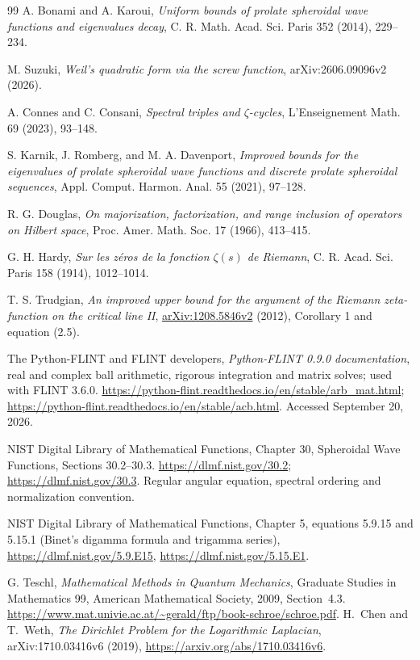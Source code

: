 \documentclass[11pt]{article}
\theoremstyle{remark}
\begin{document}
\begin{thebibliography}{99}
A. Bonami and A. Karoui,
\emph{Uniform bounds of prolate spheroidal wave functions and eigenvalues decay},
C. R. Math. Acad. Sci. Paris 352 (2014), 229--234.

M. Suzuki,
\emph{Weil's quadratic form via the screw function},
arXiv:2606.09096v2 (2026).

A. Connes and C. Consani,
\emph{Spectral triples and $\zeta$-cycles},
L'Enseignement Math. 69 (2023), 93--148.

S. Karnik, J. Romberg, and M. A. Davenport,
\emph{Improved bounds for the eigenvalues of prolate spheroidal wave functions and discrete prolate spheroidal sequences},
Appl. Comput. Harmon. Anal. 55 (2021), 97--128.

R. G. Douglas,
\emph{On majorization, factorization, and range inclusion of operators on Hilbert space},
Proc. Amer. Math. Soc. 17 (1966), 413--415.

G. H. Hardy, \emph{Sur les z\'eros de la fonction $\zeta(s)$ de Riemann},
C. R. Acad. Sci. Paris 158 (1914), 1012--1014.

T. S. Trudgian,
\emph{An improved upper bound for the argument of the Riemann
zeta-function on the critical line II},
\href{https://arxiv.org/abs/1208.5846v2}{arXiv:1208.5846v2} (2012),
Corollary 1 and equation (2.5).

The Python-FLINT and FLINT developers,
\emph{Python-FLINT 0.9.0 documentation}, real and complex ball arithmetic,
rigorous integration and matrix solves; used with FLINT 3.6.0.
\url{https://python-flint.readthedocs.io/en/stable/arb_mat.html};
\url{https://python-flint.readthedocs.io/en/stable/acb.html}.
Accessed September 20, 2026.

NIST Digital Library of Mathematical Functions, Chapter 30,
Spheroidal Wave Functions, Sections 30.2--30.3.
\url{https://dlmf.nist.gov/30.2};
\url{https://dlmf.nist.gov/30.3}.
Regular angular equation, spectral ordering and normalization convention.

NIST Digital Library of Mathematical Functions, Chapter 5,
equations 5.9.15 and 5.15.1 (Binet's digamma formula and trigamma series),
\url{https://dlmf.nist.gov/5.9.E15},
\url{https://dlmf.nist.gov/5.15.E1}.

G. Teschl, \emph{Mathematical Methods in Quantum Mechanics},
Graduate Studies in Mathematics 99, American Mathematical Society, 2009,
Section~4.3.
\url{https://www.mat.univie.ac.at/~gerald/ftp/book-schroe/schroe.pdf}.
H.~Chen and T.~Weth,
\emph{The Dirichlet Problem for the Logarithmic Laplacian},
arXiv:1710.03416v6 (2019),
\url{https://arxiv.org/abs/1710.03416v6}.


\end{thebibliography}
\end{document}
